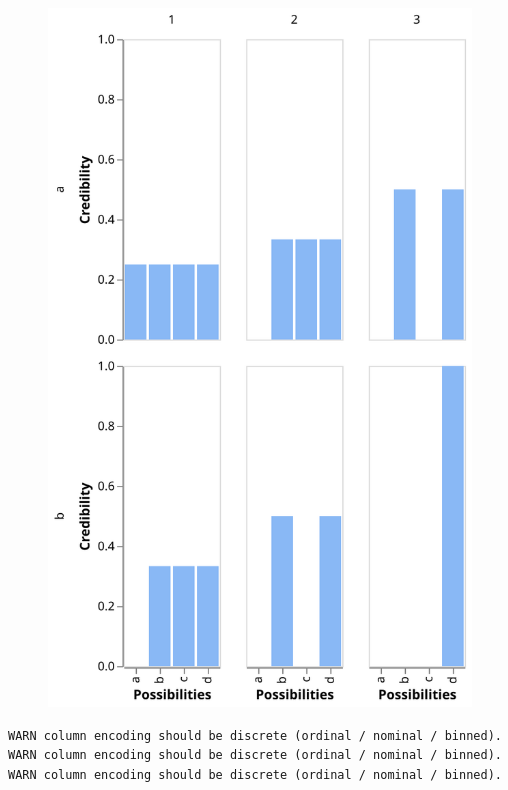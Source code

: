 \documentclass[
  letterpaper,
  DIV=11,
  numbers=noendperiod]{scrreprt}
\begin{document}
\begin{figure}[H]

{\centering \includegraphics{./introduction-credibility-models-and-parameters_files/figure-pdf/cell-4-output-1.svg}

}

\end{figure}

\begin{verbatim}
WARN column encoding should be discrete (ordinal / nominal / binned).
WARN column encoding should be discrete (ordinal / nominal / binned).
WARN column encoding should be discrete (ordinal / nominal / binned).
\end{verbatim}
\end{document}
